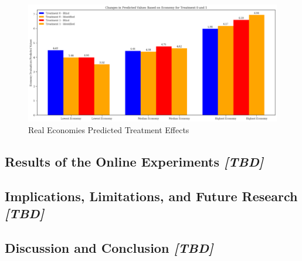 \documentclass[
]{article}
\begin{document}
\begin{figure}
\hypertarget{fig:label}{%
\centering
\includegraphics[width=1\textwidth,height=1\textheight]{pred_low.png}
\caption{Real Economies Predicted Treatment Effects}\label{fig:label}
}
\end{figure}

\hypertarget{results-of-the-online-experiments-tbd}{%
\subsection{\texorpdfstring{Results of the Online Experiments
\emph{{[}TBD{]}}}{Results of the Online Experiments {[}TBD{]}}}\label{results-of-the-online-experiments-tbd}}

\hypertarget{implications-limitations-and-future-research-tbd}{%
\subsection{\texorpdfstring{Implications, Limitations, and Future
Research
\emph{{[}TBD{]}}}{Implications, Limitations, and Future Research {[}TBD{]}}}\label{implications-limitations-and-future-research-tbd}}

\hypertarget{discussion-and-conclusion-tbd}{%
\subsection{\texorpdfstring{Discussion and Conclusion
\emph{{[}TBD{]}}}{Discussion and Conclusion {[}TBD{]}}}\label{discussion-and-conclusion-tbd}}
\end{document}

